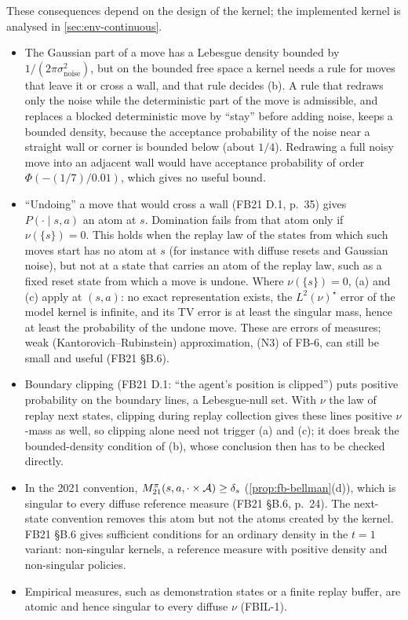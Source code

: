 \begin{remark}\label{rem:fb-dom}
These consequences depend on the design of the kernel; the implemented kernel is analysed in \cref{sec:env-continuous}.
\begin{itemize}[nosep]
\item The Gaussian part of a move has a Lebesgue density bounded by $1/(2\pi\sigma_{\mathrm{noise}}^2)$, but on the bounded free space a kernel needs a rule for moves that leave it or cross a wall, and that rule decides (b).
  A rule that redraws only the noise while the deterministic part of the move is admissible, and replaces a blocked deterministic move by ``stay'' before adding noise, keeps a bounded density, because the acceptance probability of the noise near a straight wall or corner is bounded below (about $1/4$).
  Redrawing a full noisy move into an adjacent wall would have acceptance probability of order $\Phi(-(1/7)/0.01)$, which gives no useful bound.
\item ``Undoing'' a move that would cross a wall (FB21 D.1, p.~35) gives $P(\cdot\mid s,a)$ an atom at $s$. Domination fails from that atom only if $\nu(\{s\})=0$.
  This holds when the replay law of the states from which such moves start has no atom at $s$ (for instance with diffuse resets and Gaussian noise), but not at a state that carries an atom of the replay law, such as a fixed reset state from which a move is undone.
  Where $\nu(\{s\})=0$, (a) and (c) apply at $(s,a)$: no exact representation exists, the $L^2(\nu)^\star$ error of the model kernel is infinite, and its TV error is at least the singular mass, hence at least the probability of the undone move.
  These are errors of measures; weak (Kantorovich--Rubinstein) approximation, (N3) of FB-6, can still be small and useful (FB21 \S B.6).
\item Boundary clipping (FB21 D.1: ``the agent's position is clipped'') puts positive probability on the boundary lines, a Lebesgue-null set. With $\nu$ the law of replay next states, clipping during replay collection gives these lines positive $\nu$-mass as well, so clipping alone need not trigger (a) and (c); it does break the bounded-density condition of (b), whose conclusion then has to be checked directly.
\item In the 2021 convention, $M^\pi_{21}(s,a,\cdot\times\mathcal{A})\ge\delta_s$ (\cref{prop:fb-bellman}(d)), which is singular to every diffuse reference measure (FB21 \S B.6, p.~24). The next-state convention removes this atom but not the atoms created by the kernel. FB21 \S B.6 gives sufficient conditions for an ordinary density in the $t=1$ variant: non-singular kernels, a reference measure with positive density and non-singular policies.
\item Empirical measures, such as demonstration states or a finite replay buffer, are atomic and hence singular to every diffuse $\nu$ (FBIL-1).
\end{itemize}
\end{remark}

